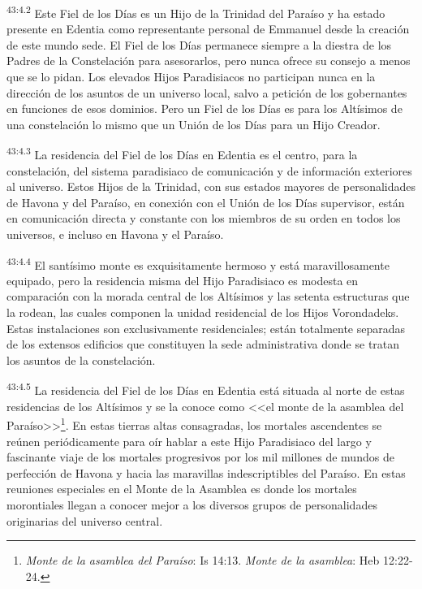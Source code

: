 \par
\textsuperscript{43:4.2} Este Fiel de los Días es un Hijo de la Trinidad del Paraíso y ha estado presente en Edentia como representante personal de Emmanuel desde la creación de este mundo sede. El Fiel de los Días permanece siempre a la diestra de los Padres de la Constelación para asesorarlos, pero nunca ofrece su consejo a menos que se lo pidan. Los elevados Hijos Paradisiacos no participan nunca en la dirección de los asuntos de un universo local, salvo a petición de los gobernantes en funciones de esos dominios. Pero un Fiel de los Días es para los Altísimos de una constelación lo mismo que un Unión de los Días para un Hijo Creador.

\par
\textsuperscript{43:4.3} La residencia del Fiel de los Días en Edentia es el centro, para la constelación, del sistema paradisiaco de comunicación y de información exteriores al universo. Estos Hijos de la Trinidad, con sus estados mayores de personalidades de Havona y del Paraíso, en conexión con el Unión de los Días supervisor, están en comunicación directa y constante con los miembros de su orden en todos los universos, e incluso en Havona y el Paraíso.

\par
\textsuperscript{43:4.4} El santísimo monte es exquisitamente hermoso y está maravillosamente equipado, pero la residencia misma del Hijo Paradisiaco es modesta en comparación con la morada central de los Altísimos y las setenta estructuras que la rodean, las cuales componen la unidad residencial de los Hijos Vorondadeks. Estas instalaciones son exclusivamente residenciales; están totalmente separadas de los extensos edificios que constituyen la sede administrativa donde se tratan los asuntos de la constelación.

\par
\textsuperscript{43:4.5} La residencia del Fiel de los Días en Edentia está situada al norte de estas residencias de los Altísimos y se la conoce como <<el monte de la asamblea del Paraíso>>\footnote{\textit{Monte de la asamblea del Paraíso}: Is 14:13. \textit{Monte de la asamblea}: Heb 12:22-24.}. En estas tierras altas consagradas, los mortales ascendentes se reúnen periódicamente para oír hablar a este Hijo Paradisiaco del largo y fascinante viaje de los mortales progresivos por los mil millones de mundos de perfección de Havona y hacia las maravillas indescriptibles del Paraíso. En estas reuniones especiales en el Monte de la Asamblea es donde los mortales morontiales llegan a conocer mejor a los diversos grupos de personalidades originarias del universo central.

